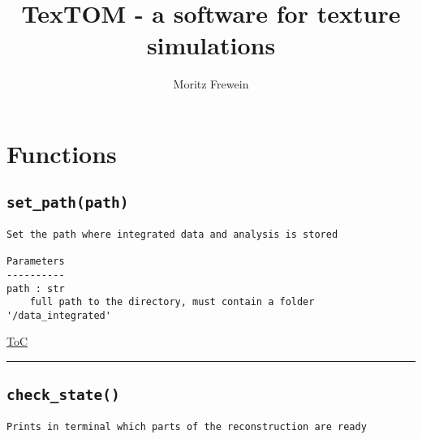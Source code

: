 \documentclass{article}
\title{TexTOM - a software for texture simulations}
\author{Moritz Frewein}
\begin{document}
\maketitle
\label{toc}
\tableofcontents

                
\subsectionfont{\large\ttfamily\raggedright}


\section{Functions}\label{sec:functions}
\subsection*{\texttt{set\_path(path)}}

\begin{lstlisting}[language=docstring]
Set the path where integrated data and analysis is stored

Parameters
----------
path : str
    full path to the directory, must contain a folder '/data_integrated'
\end{lstlisting}

\begin{flushright}

\hyperref[toc]{ToC}

\end{flushright}



\vspace{5mm}

\hrule

\subsection*{\texttt{check\_state()}}

\begin{lstlisting}[language=docstring]
Prints in terminal which parts of the reconstruction are ready
    
\end{lstlisting}
\end{document}
